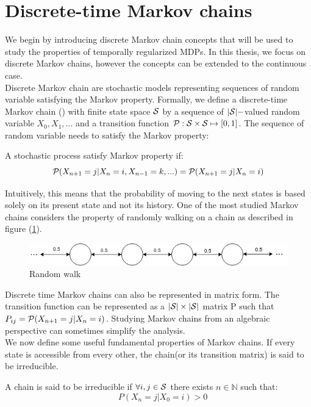 \section{Discrete-time Markov chains}
We begin by introducing discrete Markov chain concepts that will be used to study the properties of temporally regularized MDPs. In this thesis, we focus on discrete Markov chains, however the concepts can be extended to the continuous case.\\ Discrete Markov chain are stochastic models representing sequences of random variable satisfying the Markov property. Formally, we define a discrete-time Markov chain (\citep{norris1998markov,levin2017markov,bremaud2013markov})  with finite state space $\mathcal{S}$ by a sequence of $|\mathcal{S}|-$valued random variable $X_0,X_1,..$. and a transition function $\mathcal{P} : \mathcal{S} \times \mathcal{S} \mapsto [0,1]$. The sequence of random variable needs to satisfy the Markov property:
\begin{definition}
A stochastic process satisfy Markov property if:
\begin{equation}
    \mathcal{P} (X_{n+1}=j|X_n = i,X_{n-1}=k,...) = \mathcal{P} (X_{n+1}=j|X_n = i)
\end{equation}
\end{definition}
Intuitively, this means that the probability of moving to the next states is based solely on its present state and not its history. One of the most studied Markov chains considers the property of randomly walking on a chain as described in figure (\ref{fig:random_walk}).\\
\begin{figure}
    \centering
    \includegraphics[scale=0.7]{fig/Markov_chain.png}
    \caption[Random walk]{Random walk}
    \label{fig:random_walk}
\end{figure}
Discrete time Markov chains can also be represented in matrix form. The transition function can be represented as a $|\mathcal{S}| \times |\mathcal{S}|$ matrix P such that $P_{ij} = \mathcal{P}(X_{n+1}=j|X_n=i)$. Studying Markov chains from an algebraic perspective can sometimes simplify the analysis.  \\
We now define some useful fundamental properties of Markov chains.
If every state is accessible from every other, the chain(or its transition matrix) is said to be irreducible. 
\begin{definition}
A chain is said to be irreducible if $\forall i,j \in \mathcal{S}$ there exists $n \in \mathbb{N}$ such that:
\begin{equation}
      \quad P(X_n = j|X_0=i) > 0
\end{equation}
\end{definition}
